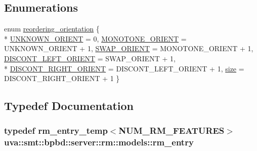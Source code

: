 \subsection*{Enumerations}
\begin{DoxyCompactItemize}
\item 
enum \hyperlink{namespaceuva_1_1smt_1_1bpbd_1_1server_1_1rm_1_1models_ad5c3e828e24fc03450e32df9c511e1ef}{reordering\+\_\+orientation} \{ \\*
\hyperlink{namespaceuva_1_1smt_1_1bpbd_1_1server_1_1rm_1_1models_ad5c3e828e24fc03450e32df9c511e1efa348fb8ec8b329842e78cc51670945b37}{U\+N\+K\+N\+O\+W\+N\+\_\+\+O\+R\+I\+E\+N\+T} = 0, 
\hyperlink{namespaceuva_1_1smt_1_1bpbd_1_1server_1_1rm_1_1models_ad5c3e828e24fc03450e32df9c511e1efa17e3572ae1bdd45be62a635f317b73b6}{M\+O\+N\+O\+T\+O\+N\+E\+\_\+\+O\+R\+I\+E\+N\+T} = U\+N\+K\+N\+O\+W\+N\+\_\+\+O\+R\+I\+E\+N\+T + 1, 
\hyperlink{namespaceuva_1_1smt_1_1bpbd_1_1server_1_1rm_1_1models_ad5c3e828e24fc03450e32df9c511e1efa0742cf6d99672bf9fab6ed1325a03aa5}{S\+W\+A\+P\+\_\+\+O\+R\+I\+E\+N\+T} = M\+O\+N\+O\+T\+O\+N\+E\+\_\+\+O\+R\+I\+E\+N\+T + 1, 
\hyperlink{namespaceuva_1_1smt_1_1bpbd_1_1server_1_1rm_1_1models_ad5c3e828e24fc03450e32df9c511e1efa2c9b3ec75e7d1ceac9aaf403337b7a55}{D\+I\+S\+C\+O\+N\+T\+\_\+\+L\+E\+F\+T\+\_\+\+O\+R\+I\+E\+N\+T} = S\+W\+A\+P\+\_\+\+O\+R\+I\+E\+N\+T + 1, 
\\*
\hyperlink{namespaceuva_1_1smt_1_1bpbd_1_1server_1_1rm_1_1models_ad5c3e828e24fc03450e32df9c511e1efa5e75b8d13ae4d79b0710adafe681339d}{D\+I\+S\+C\+O\+N\+T\+\_\+\+R\+I\+G\+H\+T\+\_\+\+O\+R\+I\+E\+N\+T} = D\+I\+S\+C\+O\+N\+T\+\_\+\+L\+E\+F\+T\+\_\+\+O\+R\+I\+E\+N\+T + 1, 
\hyperlink{namespaceuva_1_1smt_1_1bpbd_1_1server_1_1rm_1_1models_ad5c3e828e24fc03450e32df9c511e1efa641c13fc42b56fd967d07d48bad5579c}{size} = D\+I\+S\+C\+O\+N\+T\+\_\+\+R\+I\+G\+H\+T\+\_\+\+O\+R\+I\+E\+N\+T + 1
 \}
\end{DoxyCompactItemize}


\subsection{Typedef Documentation}
\hypertarget{namespaceuva_1_1smt_1_1bpbd_1_1server_1_1rm_1_1models_a67353bb21590b2a2adf05500899439ed}{}
\subsubsection[{rm\+\_\+entry}]{\setlength{\rightskip}{0pt plus 5cm}typedef {\bf rm\+\_\+entry\+\_\+temp}$<$N\+U\+M\+\_\+\+R\+M\+\_\+\+F\+E\+A\+T\+U\+R\+E\+S$>$ {\bf uva\+::smt\+::bpbd\+::server\+::rm\+::models\+::rm\+\_\+entry}}\label{namespaceuva_1_1smt_1_1bpbd_1_1server_1_1rm_1_1models_a67353bb21590b2a2adf05500899439ed}


